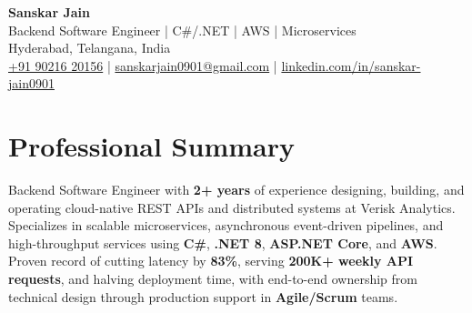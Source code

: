 \documentclass[a4paper,10pt]{article}
\begin{document}
\begin{center}
    {\LARGE \textbf{Sanskar Jain}} \\
    \vspace{2pt}
    Backend Software Engineer \;|\; C\#/.NET \;|\; AWS \;|\; Microservices \\
    \vspace{2pt}
    Hyderabad, Telangana, India \\
    \href{tel:+919021620156}{+91 90216 20156} \;|\;
    \href{mailto:sanskarjain0901@gmail.com}{sanskarjain0901@gmail.com} \;|\;
    \href{https://www.linkedin.com/in/sanskar-jain0901/}{linkedin.com/in/sanskar-jain0901}
\end{center}

\vspace{3pt}

\section*{Professional Summary}
Backend Software Engineer with \textbf{2+ years} of experience designing, building, and operating cloud-native REST APIs and distributed systems at Verisk Analytics.
Specializes in scalable microservices, asynchronous event-driven pipelines, and high-throughput services using \textbf{C\#}, \textbf{.NET 8}, \textbf{ASP.NET Core}, and \textbf{AWS}.
Proven record of cutting latency by \textbf{83\%}, serving \textbf{200K+ weekly API requests}, and halving deployment time, with end-to-end ownership from technical design through production support in \textbf{Agile/Scrum} teams.
\end{document}
